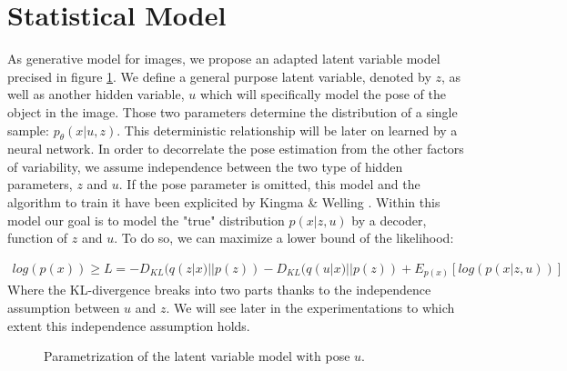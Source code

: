 \documentclass[letterpaper, twoside]{article}
\begin{document}
\section{Statistical Model}
    As generative model for images, we propose an adapted latent variable model precised in figure \ref{tvaegraphmodel}. We define a general purpose latent variable, denoted by $z$, as well as another hidden variable, $u$ which will specifically model the pose of the object in the image. Those two parameters determine the distribution of a single sample: $p_\theta(x|u,z)$. This deterministic relationship will be later on learned by a neural network. In order to decorrelate the pose estimation from the other factors of variability, we assume independence between the two type of hidden parameters, $z$ and $u$. If the pose parameter is omitted, this model and the algorithm to train it have been explicited by Kingma \& Welling \cite{Kingma.aevb}.
    Within this model our goal is to model the "true" distribution $p(x|z,u)$ by a decoder, function of $z$ and $u$. To do so, we can maximize a lower bound of the likelihood:

\begin{align}
log(p(x)) \geq L = - D_{KL}(q(z|x)||p(z)) - D_{KL}(q(u|x)||p(z)) + E_{p(x)}[log(p(x|z, u))]
\end{align}
 Where the KL-divergence breaks into two parts thanks to the independence assumption between $u$ and $z$. We will see later in the experimentations to which extent this independence assumption holds.


    \begin{figure}[h]
    \centering
    \caption{Parametrization of the latent variable model with pose $u$.}
    \label{tvaegraphmodel}
    \end{figure}
\end{document}
